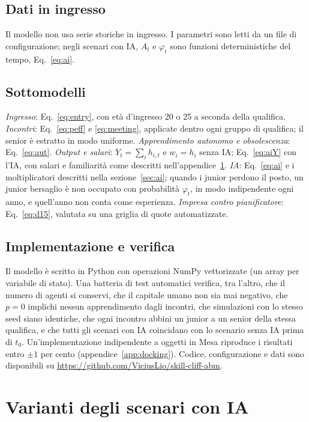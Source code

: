 \documentclass[preprint,12pt,authoryear]{elsarticle}
\begin{document}
\subsection{Dati in ingresso}
Il modello non usa serie storiche in ingresso. I parametri sono letti da un file di configurazione; negli scenari con IA, $A_t$ e $\varphi_t$ sono funzioni deterministiche del tempo, Eq.~\eqref{eq:ai}.

\subsection{Sottomodelli}
\emph{Ingresso}: Eq.~\eqref{eq:entry}, con età d'ingresso 20 o 25 a seconda della qualifica. \emph{Incontri}: Eq.~\eqref{eq:peff} e \eqref{eq:meeting}, applicate dentro ogni gruppo di qualifica; il senior è estratto in modo uniforme. \emph{Apprendimento autonomo e obsolescenza}: Eq.~\eqref{eq:aut}. \emph{Output e salari}: $Y_t=\sum_i h_{i,t}$ e $w_i=h_i$ senza IA; Eq.~\eqref{eq:aiY} con l'IA, con salari e familiarità come descritti nell'appendice~\ref{app:variants}. \emph{IA}: Eq.~\eqref{eq:ai} e i moltiplicatori descritti nella sezione~\ref{sec:ai}; quando i junior perdono il posto, un junior bersaglio è non occupato con probabilità $\varphi_t$, in modo indipendente ogni anno, e quell'anno non conta come esperienza. \emph{Impresa contro pianificatore}: Eq.~\eqref{eq:d15}, valutata su una griglia di quote automatizzate.

\subsection{Implementazione e verifica}
Il modello è scritto in Python con operazioni NumPy vettorizzate (un array per variabile di stato). Una batteria di test automatici verifica, tra l'altro, che il numero di agenti si conservi, che il capitale umano non sia mai negativo, che $p=0$ implichi nessun apprendimento dagli incontri, che simulazioni con lo stesso seed siano identiche, che ogni incontro abbini un junior a un senior della stessa qualifica, e che tutti gli scenari con IA coincidano con lo scenario senza IA prima di $t_0$. Un'implementazione indipendente a oggetti in Mesa riproduce i risultati entro $\pm1$ per cento (appendice~\ref{app:docking}). Codice, configurazione e dati sono disponibili su \url{https://github.com/ViciusLio/skill-cliff-abm}.

\section{Varianti degli scenari con IA}\label{app:variants}
\end{document}
